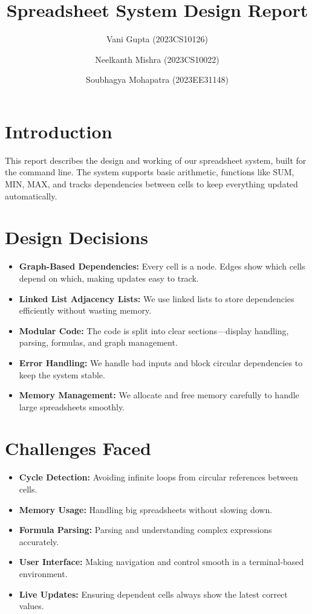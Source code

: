 \documentclass{article}
\title{Spreadsheet System Design Report}
\author{Vani Gupta (2023CS10126) \and Neelkanth Mishra (2023CS10022) \and Soubhagya Mohapatra (2023EE31148)}
\begin{document}
\maketitle

\section{Introduction}
This report describes the design and working of our spreadsheet system, built for the command line. The system supports basic arithmetic, functions like SUM, MIN, MAX, and tracks dependencies between cells to keep everything updated automatically.

\section{Design Decisions}
\begin{itemize}
    \item \textbf{Graph-Based Dependencies:} Every cell is a node. Edges show which cells depend on which, making updates easy to track.
    \item \textbf{Linked List Adjacency Lists:} We use linked lists to store dependencies efficiently without wasting memory.
    \item \textbf{Modular Code:} The code is split into clear sections—display handling, parsing, formulas, and graph management.
    \item \textbf{Error Handling:} We handle bad inputs and block circular dependencies to keep the system stable.
    \item \textbf{Memory Management:} We allocate and free memory carefully to handle large spreadsheets smoothly.
\end{itemize}

\section{Challenges Faced}

\begin{itemize}
    \item \textbf{Cycle Detection:} Avoiding infinite loops from circular references between cells.
    \item \textbf{Memory Usage:} Handling big spreadsheets without slowing down.
    \item \textbf{Formula Parsing:} Parsing and understanding complex expressions accurately.
    \item \textbf{User Interface:} Making navigation and control smooth in a terminal-based environment.
    \item \textbf{Live Updates:} Ensuring dependent cells always show the latest correct values.
\end{itemize}
\end{document}
